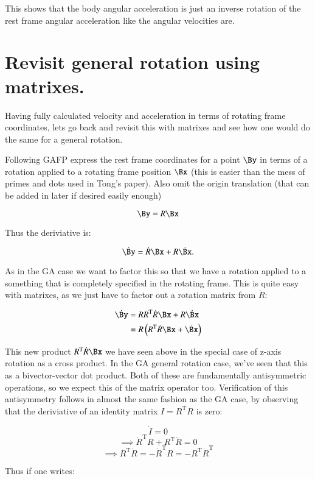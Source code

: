 \documentclass{article}      %
\newcommand{\dt}[1]{\dot{#1}}
\newcommand{\transpose}[1]{{#1}^{\text{T}}}
\begin{document}
This shows that the body angular acceleration is just an inverse rotation of the rest frame angular acceleration like the angular velocities are.

\section{ Revisit general rotation using matrixes. }

Having fully calculated velocity and acceleration in terms of rotating frame coordinates, lets
go back and revisit this with matrixes and see how one would do the same for a general rotation.

Following GAFP express the rest frame coordinates for a point $\By$ in terms of a rotation
applied to a rotating frame position $\Bx$ (this is easier than the mess of primes and dots
used in Tong's paper).  Also omit the origin translation (that can be added in later if desired
easily enough)

\[
\By = R \Bx
\]

Thus the deriviative is:

\[
\dt{\By} = \dt{R} \Bx + R \dt{\Bx}.
\]

As in the GA case we want to factor this so that we have a rotation applied to a something
that is completely specified in the rotating frame.  This
is quite easy with matrixes, as we just have to factor out a rotation matrix from $\dt{R}$:

\begin{align*}
\dt{\By} 
&= R \transpose{R}\dt{R} \Bx + R \dt{\Bx} \\
&= R \left(\transpose{R}\dt{R} \Bx + \dt{\Bx} \right) \\
\end{align*}

This new product $\transpose{R}\dt{R} \Bx$ we have seen above in the special case of z-axis
rotation as a cross product.  In the GA general rotation case, we've seen that this as a
bivector-vector dot product.  Both of these are fundamentally antisymmetric operations,
so we expect this of the matrix operator too.  Verification of this antisymmetry follows
in almost the same fashion as the GA case, by observing that the deriviative of an identity
matrix $I = \transpose{R}R$ is zero:

\[
\dt{I} = 0
\]
\[
\implies
\transpose{\dt{R}}R + \transpose{R}\dt{R} = 0
\]
\[
\implies
\transpose{R}\dt{R} = -\transpose{\dt{R}}R = -\transpose{\transpose{R}\dt{R}}
\]

Thus if one writes:
\end{document}
